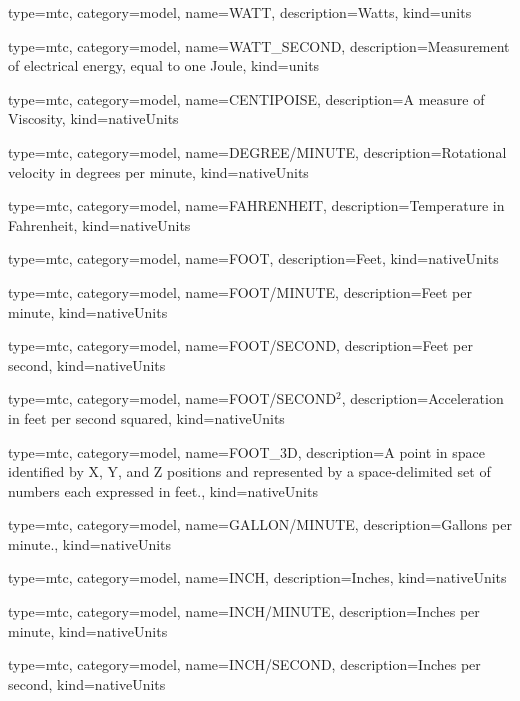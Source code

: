 {
  type=mtc,
  category=model,
  name={WATT},
  description={Watts},
  kind={units}
}


{
  type=mtc,
  category=model,
  name={WATT\_SECOND},
  description={Measurement of electrical energy, equal to one Joule},
  kind={units}
}


{
  type=mtc,
  category=model,
  name={CENTIPOISE},
  description={A measure of Viscosity},
  kind={nativeUnits}
}


{
  type=mtc,
  category=model,
  name={DEGREE/MINUTE},
  description={Rotational velocity in degrees per minute},
  kind={nativeUnits}
}


{
  type=mtc,
  category=model,
  name={FAHRENHEIT},
  description={Temperature in Fahrenheit},
  kind={nativeUnits}
}


{
  type=mtc,
  category=model,
  name={FOOT},
  description={Feet},
  kind={nativeUnits}
}


{
  type=mtc,
  category=model,
  name={FOOT/MINUTE},
  description={Feet per minute},
  kind={nativeUnits}
}


{
  type=mtc,
  category=model,
  name={FOOT/SECOND},
  description={Feet per second},
  kind={nativeUnits}
}


{
  type=mtc,
  category=model,
  name={FOOT/SECOND$^2$},
  description={Acceleration in feet per second squared},
  kind={nativeUnits}
}


{
  type=mtc,
  category=model,
  name={FOOT\_3D},
  description={A point in space identified by X, Y, and Z positions and represented by a space-delimited set of numbers each expressed in feet.},
  kind={nativeUnits}
}


{
  type=mtc,
  category=model,
  name={GALLON/MINUTE},
  description={Gallons per minute.},
  kind={nativeUnits}
}


{
  type=mtc,
  category=model,
  name={INCH},
  description={Inches},
  kind={nativeUnits}
}


{
  type=mtc,
  category=model,
  name={INCH/MINUTE},
  description={Inches per minute},
  kind={nativeUnits}
}


{
  type=mtc,
  category=model,
  name={INCH/SECOND},
  description={Inches per second},
  kind={nativeUnits}
}


